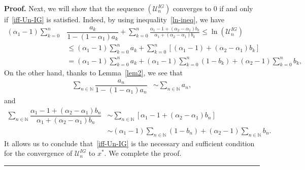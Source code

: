 \documentclass[a4paper, 11pt]{article}
\newenvironment{proof}[1][Proof]{\textbf{#1.} }{\hfill\rule{0.5em}{0.5em}}
\begin{document}
\begin{proof}
			Next, we will show that the sequence $(\mathcal{U}_n^{IG})$ converges to $0$ if and only if~\eqref{iff-Un-IG} is satisfied. Indeed, by using inequality~\eqref{ln-ineq}, we have
			\begin{align*}
				\displaystyle (\alpha_1-1)\sum_{k=0}^{n} & \dfrac{a_k}{1-(1 - \alpha_1 )a_k}  +\sum_{k=0}^{n}\frac{\alpha_1 -1 + (\alpha_2 - \alpha_1)b_k}{\alpha_1 + (\alpha_2 - \alpha_1)b_k}  \le \ln(\mathcal{U}_n^{IG}) \\ & \le (\alpha_1-1)\sum_{k=0}^{n} a_k + \sum_{k=0}^{n} [(\alpha_1-1)+(\alpha_2 - \alpha_1)b_k] \\ &= (\alpha_1-1)\sum_{k=0}^{n}a_k + (\alpha_1-1)\sum_{k=0}^{n} (1 - b_k) + (\alpha_2-1) \sum_{k=0}^{n} b_k,
			\end{align*}
			On the other hand, thanks to Lemma~\ref{lem2}, we see that
			\begin{align*}
				\displaystyle \sum_{n \in \mathbb{N}} \dfrac{a_n}{1-(1 - \alpha_1)a_n} &\sim  \sum_{n \in \mathbb{N}} a_n, 
			\end{align*}
			and
			\begin{align*}
				\sum_{n \in \mathbb{N}} \dfrac{\alpha_1 - 1+(\alpha_2 - \alpha_1) b_n}{\alpha_1+(\alpha_2 - \alpha_1) b_n} &\sim  \sum_{n \in \mathbb{N}} [\alpha_1- 1+(\alpha_2 - \alpha_1)b_n] \\
				&\sim (\alpha_1-1) \sum_{n \in \mathbb{N}} (1 - b_n) + (\alpha_2-1) \sum_{n \in \mathbb{N}} b_n.
			\end{align*}
It allows us to conclude that~\eqref{iff-Un-IG} is the necessary and sufficient condition for the convergence of $\mathcal{U}^{IG}_{n}$ to $x^*$. We complete the proof.
		\end{proof}
\end{document}
